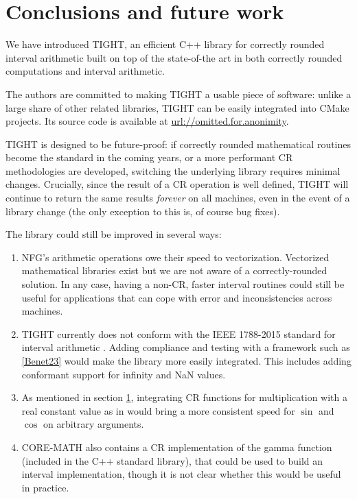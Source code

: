 \section{Conclusions and future work}
We have introduced TIGHT, an efficient C++ library for correctly rounded interval arithmetic built on top of the state-of-the art in both correctly rounded computations and interval arithmetic.

The authors are committed to making TIGHT a usable piece of software: unlike a large share of other related libraries, TIGHT can be easily integrated into CMake projects. Its source code is available at \url{url://omitted.for.anonimity}.

TIGHT is designed to be future-proof: if correctly rounded mathematical routines become the standard in the coming years, or a more performant CR methodologies are developed, switching the underlying library requires minimal changes.
Crucially, since the result of a CR operation is well defined, TIGHT will continue to return the same results \emph{forever} on all machines, even in the event of a library change (the only exception to this is, of course bug fixes).

The library could still be improved in several ways:
\begin{enumerate}
	\item NFG's arithmetic operations owe their speed to vectorization. Vectorized mathematical libraries exist \cite{sleef} but we are not aware of a correctly-rounded solution. In any case, having a non-CR, faster interval routines could still be useful for applications that can cope with error and inconsistencies across machines.
	\item TIGHT currently does not conform with the IEEE 1788-2015 standard for interval arithmetic \cite{ieee1788}. Adding compliance and testing with a framework such as \ref{Benet23} would make the library more easily integrated. This includes adding conformant support for infinity and NaN values.
	\item As mentioned in section \ref{}, integrating CR functions for multiplication with a real constant value as in \cite{crpi} would bring a more consistent speed for $\sin$ and $\cos$ on arbitrary arguments.
	\item CORE-MATH also contains a CR implementation of the gamma function (included in the C++ standard library), that could be used to build an interval implementation, though it is not clear whether this would be useful in practice.
\end{enumerate}
